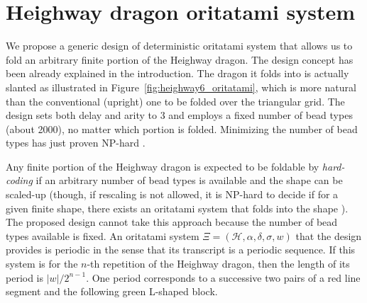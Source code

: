 \documentclass{article}
\theoremstyle{remark}
\begin{document}
	\section{Heighway dragon oritatami system}

We propose a generic design of deterministic oritatami system that allows us to fold an arbitrary finite portion of the Heighway dragon. 
The design concept has been already explained in the introduction. 
The dragon it folds into is actually slanted as illustrated in Figure~\ref{fig:heighway6_oritatami}, which is more natural than the conventional (upright) one to be folded over the triangular grid. 
The design sets both delay and arity to 3 and employs a fixed number of bead types (about 2000), no matter which portion is folded. 
Minimizing the number of bead types has just proven NP-hard \cite{HanKim2017}. 

Any finite portion of the Heighway dragon is expected to be foldable by \textit{hard-coding} if an arbitrary number of bead types is available and the shape can be scaled-up (though, if rescaling is not allowed, it is NP-hard to decide if for a given finite shape, there exists an oritatami system that folds into the shape \cite{PatitzRogers2017}). 
The proposed design cannot take this approach because the number of bead types available is fixed. 
An oritatami system $\Xi = (\mathcal{H}, \alpha, \delta, \sigma, w)$ that the design provides is periodic in the sense that its transcript is a periodic sequence. 
If this system is for the $n$-th repetition of the Heighway dragon, then the length of its period is $|w|/2^{n-1}$. 
One period corresponds to a successive two pairs of a red line segment and the following green L-shaped block. 
\end{document}
